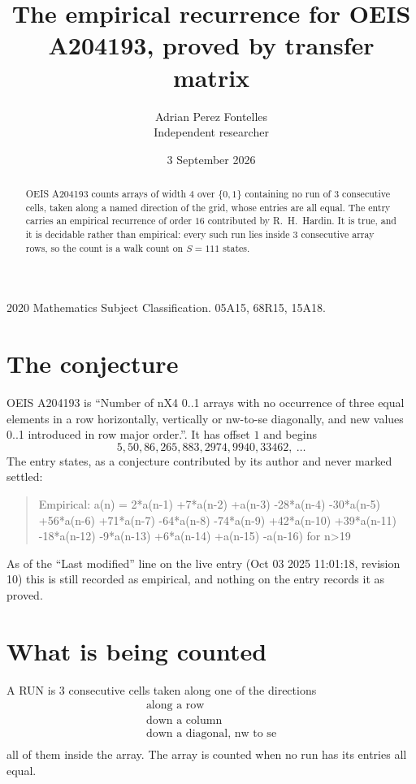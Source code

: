 \documentclass[11pt,a4paper]{article}
\title{The empirical recurrence for OEIS A204193, proved by transfer matrix}
\author{Adrian Perez Fontelles\\ \small Independent researcher}
\date{3 September 2026}
\theoremstyle{plain}
\theoremstyle{definition}
\begin{document}
\maketitle

\begin{abstract}
OEIS A204193 counts arrays of width $4$ over $\{0,1\}$ containing no run of $3$ consecutive
cells, taken along a named direction of the grid, whose entries are all equal. The entry carries
an empirical recurrence of order $16$ contributed by R.~H.~Hardin. It is true, and it is
decidable rather than empirical: every such run lies inside $3$ consecutive array rows, so
the count is a walk count on $S=111$ states.
\end{abstract}

\noindent\small 2020 Mathematics Subject Classification. 05A15, 68R15, 15A18.\normalsize

\section{The conjecture}

OEIS A204193 is ``Number of nX4 0..1 arrays with no occurrence of three equal elements in a row horizontally, vertically or nw-to-se diagonally, and new values 0..1 introduced in row major order.''. It has offset $1$ and begins
\[
5, 50, 86, 265, 883, 2974, 9940, 33462,\ \dots
\]
The entry states, as a conjecture contributed by its author and never marked settled:
\begin{quote}
Empirical: a(n) = 2*a(n-1) +7*a(n-2) +a(n-3) -28*a(n-4) -30*a(n-5) +56*a(n-6) +71*a(n-7) -64*a(n-8) -74*a(n-9) +42*a(n-10) +39*a(n-11) -18*a(n-12) -9*a(n-13) +6*a(n-14) +a(n-15) -a(n-16) for n>19
\end{quote}
As of the ``Last modified'' line on the live entry (Oct 03 2025 11:01:18, revision 10) this is still
recorded as empirical, and nothing on the entry records it as proved.

\section{What is being counted}

A RUN is $3$ consecutive cells taken along one of the directions
\[
\begin{array}{l}
\text{along a row} \\
\text{down a column} \\
\text{down a diagonal, nw to se} \\
\end{array}
\]
all of them inside the array. The array is counted when no run has its entries all equal.
\end{document}
